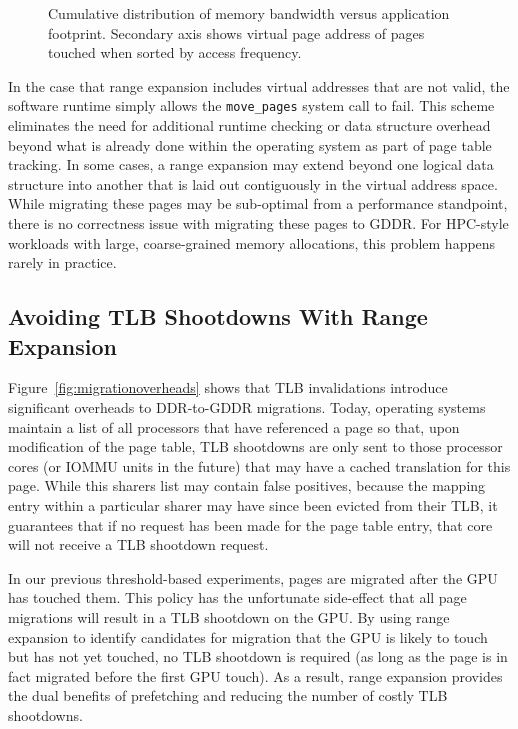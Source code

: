 \begin{figure}[pth]
    \caption{Cumulative distribution of memory bandwidth versus application footprint.  Secondary axis
    shows virtual page address of pages touched when sorted by access frequency.}
    \label{fig:cdfannotation}
\end{figure}

In the case that range expansion
includes virtual addresses that are not valid, the software runtime simply allows the {\tt move\_pages}
system call to fail.  This scheme eliminates the need for additional runtime checking or data structure
overhead beyond what is already done within the operating system as part of page table tracking.
In some cases, a range expansion may extend beyond one logical data structure into another that is laid
out contiguously in the virtual address space.  While migrating these pages may be sub-optimal from a
performance standpoint, there is no correctness issue with migrating these pages to GDDR.  For
HPC-style workloads with large, coarse-grained memory allocations, this problem happens rarely in practice.

\subsection{Avoiding TLB Shootdowns With Range Expansion}
Figure~\ref{fig:migrationoverheads} shows that TLB invalidations introduce significant overheads to DDR-to-GDDR 
migrations.  Today, operating systems maintain a list of all processors that have referenced a page
so that, upon modification of the page table, TLB shootdowns are only sent to those processor cores 
(or IOMMU units in the future) that may have a cached translation for this page.  While this sharers list
may contain false positives, because the mapping entry within a particular sharer may have since been evicted from 
their TLB, it guarantees that if no request has been made for the page table entry, that core will not receive a TLB 
shootdown request.

In our previous threshold-based experiments, pages are migrated after the GPU has touched them.
This policy has the unfortunate side-effect that all page migrations will result in a TLB shootdown
on the GPU\@.  By using range expansion to identify candidates for migration that the GPU is likely to touch 
but has not yet touched, no TLB shootdown is required (as long as the page is in fact migrated before the 
first GPU touch).  As a result, range expansion provides the dual benefits of prefetching and reducing the 
number of costly TLB shootdowns.

